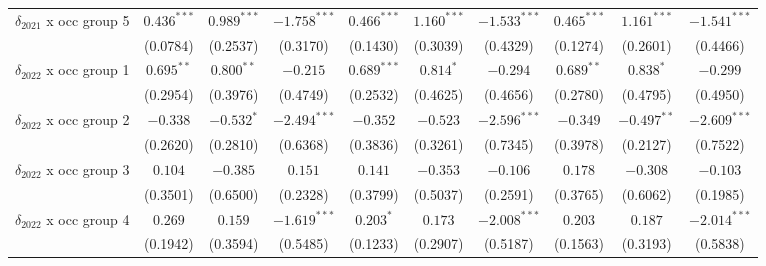 \begin{tabular}{l|ccc|ccc|ccc}
$\delta_{2021}$ x occ group 5          &           $0.436^{***}$ &   $0.989^{***}$ &  $-1.758^{***}$ &            $0.466^{***}$ &   $1.160^{***}$ &  $-1.533^{***}$ &            $0.465^{***}$ &   $1.161^{***}$ &  $-1.541^{***}$ \\
                                       &                (0.0784) &        (0.2537) &        (0.3170) &                 (0.1430) &        (0.3039) &        (0.4329) &                 (0.1274) &        (0.2601) &        (0.4466) \\
$\delta_{2022}$ x occ group 1          &            $0.695^{**}$ &    $0.800^{**}$ &        $-0.215$ &            $0.689^{***}$ &       $0.814^*$ &        $-0.294$ &             $0.689^{**}$ &       $0.838^*$ &        $-0.299$ \\
                                       &                (0.2954) &        (0.3976) &        (0.4749) &                 (0.2532) &        (0.4625) &        (0.4656) &                 (0.2780) &        (0.4795) &        (0.4950) \\
$\delta_{2022}$ x occ group 2          &                $-0.338$ &      $-0.532^*$ &  $-2.494^{***}$ &                 $-0.352$ &        $-0.523$ &  $-2.596^{***}$ &                 $-0.349$ &   $-0.497^{**}$ &  $-2.609^{***}$ \\
                                       &                (0.2620) &        (0.2810) &        (0.6368) &                 (0.3836) &        (0.3261) &        (0.7345) &                 (0.3978) &        (0.2127) &        (0.7522) \\
$\delta_{2022}$ x occ group 3          &                 $0.104$ &        $-0.385$ &         $0.151$ &                  $0.141$ &        $-0.353$ &        $-0.106$ &                  $0.178$ &        $-0.308$ &        $-0.103$ \\
                                       &                (0.3501) &        (0.6500) &        (0.2328) &                 (0.3799) &        (0.5037) &        (0.2591) &                 (0.3765) &        (0.6062) &        (0.1985) \\
$\delta_{2022}$ x occ group 4          &                 $0.269$ &         $0.159$ &  $-1.619^{***}$ &                $0.203^*$ &         $0.173$ &  $-2.008^{***}$ &                  $0.203$ &         $0.187$ &  $-2.014^{***}$ \\
                                       &                (0.1942) &        (0.3594) &        (0.5485) &                 (0.1233) &        (0.2907) &        (0.5187) &                 (0.1563) &        (0.3193) &        (0.5838) \\

\end{tabular}

